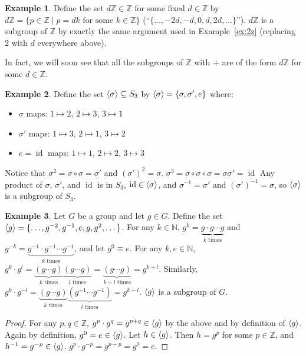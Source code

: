 \documentclass[12pt,letterpaper,DIV=11,final]{scrartcl}
\theoremstyle{plain}
\theoremstyle{definition}
\newtheorem{example}{Example}[section]
\theoremstyle{remark}
\DeclareMathOperator{\id}{id}
\begin{document}
\begin{example}\label{ex:dz}
  Define the set $d\mathbb{Z} \in \mathbb{Z}$ for some fixed $d \in \mathbb{Z}$ by $d\mathbb{Z} = \{ p \in \mathbb{Z} \mid p = dk \text{ for some } k \in \mathbb{Z} \}$ (\enquote{$\{ \dots, -2d, -d, 0, d, 2d, \dots \}$}).
  $d \mathbb{Z}$ is a subgroup of $\mathbb{Z}$ by exactly the same argument used in Example~\ref{ex:2z} (replacing $2$ with $d$ everywhere above).
\end{example}

In fact, we will soon see that all the subgroups of $\mathbb{Z}$ with $+$ are of the form $d \mathbb{Z}$ for some $d \in \mathbb{Z}$.

\begin{example}\label{ex:subgroup_s3}
  Define the set $\braket{\sigma} \subseteq S_3$ by $\braket{\sigma} = \{ \sigma, \sigma', e \}$ where:
  \begin{itemize}
    \item $\sigma$ maps: $1 \mapsto 2$, $2 \mapsto 3$, $3 \mapsto 1$
    \item $\sigma'$ maps: $1 \mapsto 3$, $2 \mapsto 1$, $3 \mapsto 2$
    \item $e = \id$ maps: $1 \mapsto 1$, $2 \mapsto 2$, $3 \mapsto 3$
  \end{itemize}

  Notice that $\sigma^2 = \sigma \circ \sigma = \sigma'$ and ${(\sigma')}^2 = \sigma$.
  $\sigma^3 = \sigma \circ \sigma \circ \sigma = \sigma \sigma' = \id$
  Any product of $\sigma$, $\sigma'$, and $\id$ is in $S_3$, $\id \in \braket{\sigma}$, and $\sigma^{-1} = \sigma'$ and ${(\sigma')}^{-1} = \sigma$, so $\braket{\sigma}$ is a subgroup of $S_3$.
\end{example}

\begin{example}
  Let $G$ be a group and let $g \in G$.
  Define the set $\braket{g} = \{ \dots, g^{-2}, g^{-1}, e, g, g^2, \dots \}$.
  For any $k \in \mathbb{N}$, $g^k = \underbrace{g \cdot g \cdots g}_\text{$k$ times}$ and $g^{-k} = \underbrace{g^{-1} \cdot g^{-1} \cdots g^{-1}}_\text{$k$ times}$, and let $g^0 \equiv e$.
  For any $k, e \in \mathbb{N}$, $g^k \cdot g^l = \underbrace{(g \cdots g)}_\text{$k$ times} \underbrace{(g \cdots g)}_\text{$l$ times} = \underbrace{(g \cdots g)}_\text{$k + l$ times} = g^{k + l}$.
  Similarly, $g^k \cdot g^{-l} = \underbrace{(g \cdots g)}_\text{$k$ times} \underbrace{(g^{-1} \cdots g^{-1})}_\text{$l$ times} = g^{k - l}$.
  $\braket{g}$ is a subgroup of $G$.
  \begin{proof}
    For any $p, q \in \mathbb{Z}$, $g^p \cdot g^q = g^{p + q} \in \braket{g}$ by the above and by definition of $\braket{g}$.
    Again by definition, $g^0 = e \in \braket{g}$.
    Let $h \in \braket{g}$.
    Then $h = g^p$ for some $p \in \mathbb{Z}$, and $h^{-1} = g^{-p} \in \braket{g}$.
    $g^p \cdot g^{-p} = g^{p - p} = g^0 = e$.
  \end{proof}
\end{example}
\end{document}
